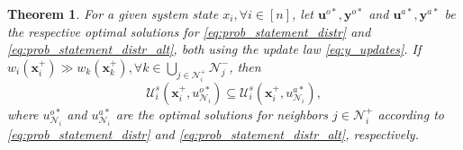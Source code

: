 \documentclass[letterpaper, 10 pt, conference]{ieeeconf}  %
\theoremstyle{plain}
\newtheorem{theorem}{Theorem}%
\begin{document}
\begin{theorem} \label{thm:alt_feasibility}
 For a given system state $x_i, \forall i \in [n]$,  let  $\mathbf{u}^{o*}, \mathbf{y}^{o*}$ and $\mathbf{u}^{a*}, \mathbf{y}^{a*}$ be the respective optimal solutions for  \eqref{eq:prob_statement_distr} and \eqref{eq:prob_statement_distr_alt}, both using the update law \eqref{eq:y_updates}.  If $w_i(\mathbf{x}_i^+) \gg w_k(\mathbf{x}_k^+), \forall k \in \bigcup_{j \in \mathcal{N}_i^+} \mathcal{N}_j^-$, then
    \begin{equation} \label{eq:thm1_set_inclusion}
        \mathcal{U}_i^s(\mathbf{x}_i^+, u_{\mathcal{N}_i}^{o*}) \subseteq \mathcal{U}_i^s(\mathbf{x}_i^+, u_{\mathcal{N}_i}^{a*}),
    \end{equation}
    where $u_{\mathcal{N}_i}^{o*}$ and $u_{\mathcal{N}_i}^{a*}$ are the optimal solutions for neighbors $j \in \mathcal{N}_i^+$ according to \eqref{eq:prob_statement_distr} and \eqref{eq:prob_statement_distr_alt}, respectively. 
\end{theorem}
\end{document}
